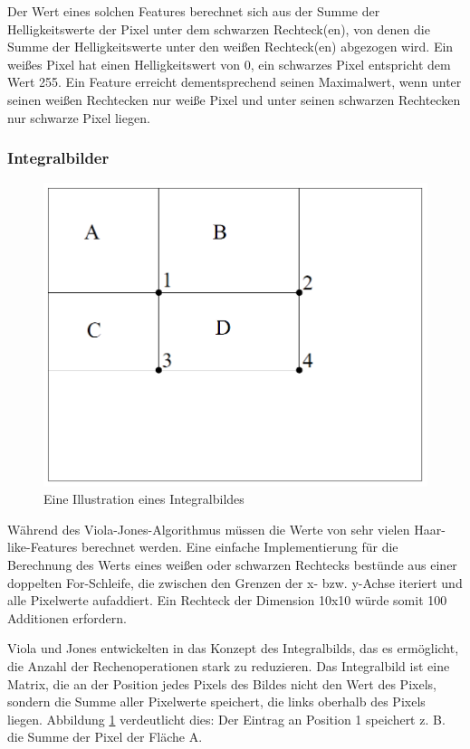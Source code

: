 \documentclass[doktyp=semarbeit, sprache=german]{TUBAFarbeiten}
\begin{document}
Der Wert eines solchen Features berechnet sich aus der Summe der Helligkeitswerte der Pixel unter dem schwarzen Rechteck(en), von denen die Summe der Helligkeitswerte unter den weißen Rechteck(en) abgezogen wird. Ein weißes Pixel hat einen Helligkeitswert von 0, ein schwarzes Pixel entspricht dem Wert 255. Ein Feature erreicht dementsprechend seinen Maximalwert, wenn unter seinen weißen Rechtecken nur weiße Pixel und unter seinen schwarzen Rechtecken nur schwarze Pixel liegen.

\subsubsection{Integralbilder}

\begin{figure}
	\centering
	\includegraphics[width=0.7\linewidth]{images/integral}
	\caption[Integralbild]{Eine Illustration eines Integralbildes}
	\label{fig:integral}
\end{figure}


Während des Viola-Jones-Algorithmus müssen die Werte von sehr vielen Haar-like-Features berechnet werden. Eine einfache Implementierung für die Berechnung des Werts eines weißen oder schwarzen Rechtecks bestünde aus einer doppelten For-Schleife, die zwischen den Grenzen der x- bzw. y-Achse iteriert und alle Pixelwerte aufaddiert. Ein Rechteck der Dimension 10x10 würde somit 100 Additionen erfordern.

Viola und Jones entwickelten in \cite{Viola01rapidobject} das Konzept des Integralbilds, das es ermöglicht, die Anzahl der Rechenoperationen stark zu reduzieren. Das Integralbild ist eine Matrix, die an der Position jedes Pixels des Bildes nicht den Wert des Pixels, sondern die Summe aller Pixelwerte speichert, die links oberhalb des Pixels liegen. Abbildung \ref{fig:integral} verdeutlicht dies: Der Eintrag an Position 1 speichert z. B. die Summe der Pixel der Fläche A.
\end{document}
